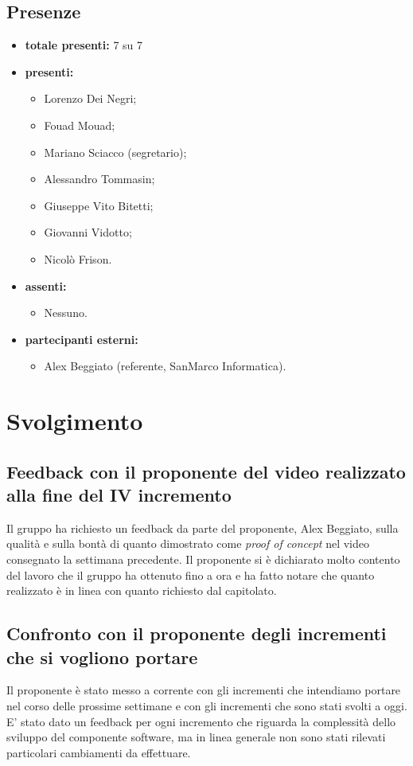 \subsection*{Presenze}
	\begin{itemize}
		\item \textbf{totale presenti:} 7 su 7
		\item \textbf{presenti: }
			\begin{itemize}			
				\item Lorenzo Dei Negri;
				\item Fouad Mouad;
				\item Mariano Sciacco (segretario);
				\item Alessandro Tommasin;
				\item Giuseppe Vito Bitetti;
				\item Giovanni Vidotto;
				\item Nicolò Frison.
			\end{itemize}
		\item \textbf{assenti: } 
			\begin{itemize}	
				\item Nessuno.
			\end{itemize}
		\item  \textbf{partecipanti esterni:}
			\begin{itemize}
				\item Alex Beggiato (referente, SanMarco Informatica).
			\end{itemize}
	\end{itemize}


\newpage
\section*{Svolgimento}

	\subsection*{Feedback con il proponente del video realizzato alla fine del IV incremento}
		Il gruppo ha richiesto un feedback da parte del proponente, Alex Beggiato, sulla qualità e sulla bontà di quanto dimostrato come \textit{proof of concept} nel video consegnato la settimana precedente. Il proponente si è dichiarato molto contento del lavoro che il gruppo ha ottenuto fino a ora e ha fatto notare che quanto realizzato è in linea con quanto richiesto dal capitolato.

	\subsection*{Confronto con il proponente degli incrementi che si vogliono portare}
		Il proponente è stato messo a corrente con gli incrementi che intendiamo portare nel corso delle prossime settimane e con gli incrementi che sono stati svolti a oggi. E' stato dato un feedback per ogni incremento che riguarda la complessità dello sviluppo del componente software, ma in linea generale non sono stati rilevati particolari cambiamenti da effettuare.

